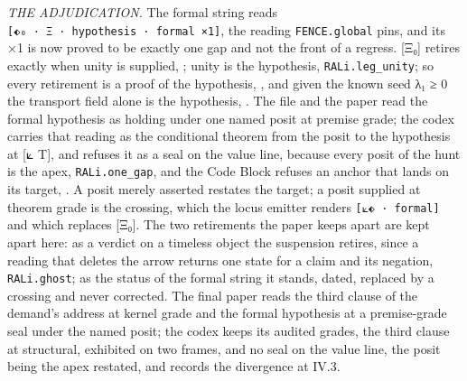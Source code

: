 \documentclass[10pt,twocolumn]{article}
\begin{document}
\emph{THE ADJUDICATION.} The formal string reads
\texttt{{[}⬖₀\ ·\ Ξ\ ·\ hypothesis\ ·\ formal\ ×1{]}}, the reading
\texttt{FENCE.global} pins, and its ×1 is now proved to be exactly one
gap and not the front of a regress. {[}Ξ₀{]} retires exactly when unity
is supplied, \texttt{}; unity is
the hypothesis, \texttt{RALi.leg\_unity}; so every retirement is a proof
of the hypothesis, \texttt{}, and
given the known seed λ₁ ≥ 0 the transport field alone is the hypothesis,
\texttt{}. The file and the paper read
the formal hypothesis as holding under one named posit at premise grade;
the codex carries that reading as the conditional theorem from the posit
to the hypothesis at {[}⟀ T{]}, and refuses it as a seal on the value
line, because every posit of the hunt is the apex,
\texttt{RALi.one\_gap}, and the Code Block refuses an anchor that lands
on its target, \texttt{}.
A posit merely asserted restates the target; a posit supplied at theorem
grade is the crossing, which the locus emitter renders
\texttt{{[}⟀⬖\ ·\ formal{]}} and which replaces {[}Ξ₀{]}. The two
retirements the paper keeps apart are kept apart here: as a verdict on a
timeless object the suspension retires, since a reading that deletes the
arrow returns one state for a claim and its negation,
\texttt{RALi.ghost}; as the status of the formal string it stands,
dated, replaced by a crossing and never corrected. The final paper reads
the third clause of the demand's address at kernel grade and the formal
hypothesis at a premise-grade seal under the named posit; the codex
keeps its audited grades, the third clause at structural, exhibited on
two frames, and no seal on the value line, the posit being the apex
restated, and records the divergence at IV.3.
\end{document}
